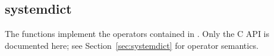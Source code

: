 %
%
%
%
%              

\subsection{systemdict}
\label{systemdict}

The  functions implement the operators contained in
.  Only the C API is documented here; see
Section~\ref{sec:systemdict} for operator semantics.

